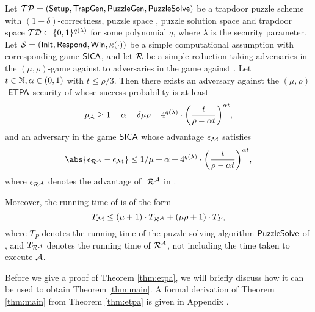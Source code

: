 \begin{theorem}\label{thm:etpa}
  Let \(\mathcal{TP} = (\mathsf{Setup},\allowbreak \mathsf{TrapGen},\allowbreak \mathsf{PuzzleGen},\allowbreak \mathsf{PuzzleSolve})\)
  be a trapdoor puzzle scheme with \((1-\delta)\)-correctness,
  puzzle space \PZ, puzzle solution space \SO
  and trapdoor space \(\mathcal{TD} \subset \{0,1\}^{q(\lambda)}\) for some polynomial \(q\),
  where \(\lambda\) is the security parameter.
  Let \(\mathcal{S} = (\mathsf{Init},\allowbreak \mathsf{Respond},\allowbreak \mathsf{Win},\allowbreak \kappa(\cdot))\)
  be a simple computational assumption
  with corresponding game \(\mathsf{SICA}\),
  and let \(\redR\) be a simple reduction
  taking adversaries in the \((\mu,\rho)\)-\ETPA game against \TP to
  adversaries in the \SICA game against \Simple.
  Let \(t \in \mathbb{N}, \alpha \in (0,1)\) with \(t \le \rho/3\).
  Then there exists an adversary \advA
  against the \((\mu,\rho)\)-\(\mathsf{ETPA}\) security of \TP
  whose success probability is at least
  \begin{equation}\label{ineq:A}
    p_{\advA} \ge 1 - \alpha - \delta \mu \rho
    - 4^{q(\lambda)} \cdot \left( \frac{t}{\rho - \alpha t} \right)^{\alpha t},
  \end{equation}
  and an adversary \redM in the game \(\mathsf{SICA}\) whose advantage \(\epsilon_{\mathcal{M}}\) satisfies
  \begin{equation}\label{ineq:M}
    \abs{\epsilon_{\redR^{\advA}} - \epsilon_{\redM}} \le 1/\mu + \alpha
    + 4^{q(\lambda)} \cdot \left( \frac{t}{\rho - \alpha t} \right)^{\alpha t},
  \end{equation}
  where \(\epsilon_{\redR^{\advA}}\) denotes the advantage of \(\text{ }\redR^{\advA}\) in \SICA.

  Moreover, the running time of \redM is of the form
  \begin{equation}\label{ineq:M:time}
    T_{\redM} \le (\mu + 1) \cdot T_{\redR^{\advA}} + (\mu \rho + 1) \cdot T_{P},
  \end{equation}
  where \(T_{P}\) denotes the running time of the puzzle solving algorithm
  \(\mathsf{PuzzleSolve}\) of \KEM, and \(T_{\redR^{\advA}}\) denotes the running time of \(\redR^{A}\),
  not including the time taken to execute \(\mathcal{A}\).
\end{theorem}

Before we give a proof of Theorem \ref{thm:etpa},
we will briefly discuss how it can be used to obtain Theorem \ref{thm:main}.
A formal derivation of Theorem \ref{thm:main} from Theorem \ref{thm:etpa}
is given in Appendix .

